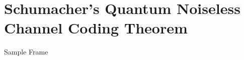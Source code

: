 \section{Schumacher's Quantum Noiseless Channel Coding Theorem}

\begin{frame}{Sample Frame}
\end{frame}
